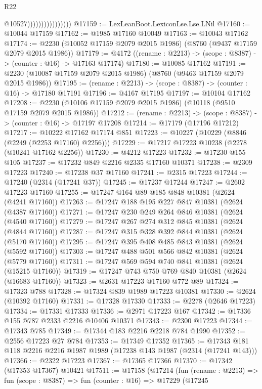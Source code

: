 \begin{lexlean}{R22}
\begin{coremodule}
                                    @10527))))))))))))))))
@17159 := LexLeanBoot.LexiconLse.Lse.LNil
@17160 := @10044 @17159
@17162 := @1985 @17160 @10049
@17163 := @10043 @17162
@17174 := @2230 (@10052 @17159 @2079 @2015 @1986) (@8760 (@9437 @17159 @2079 @2015 @1986))
@17179 := @4172 ((rename : @2213) -> (scope : @8387) -> (counter : @16) -> @17163 @17174)
@17180 := @10085 @17162
@17191 := @2230 (@10087 @17159 @2079 @2015 @1986) (@8760 (@9463 @17159 @2079 @2015 @1986))
@17195 := (rename : @2213) -> (scope : @8387) -> (counter : @16) -> @17180 @17191
@17196 := @4167 @17195
@17197 := @10104 @17162
@17208 := @2230 (@10106 @17159 @2079 @2015 @1986) (@10118 (@9510 @17159 @2079 @2015 @1986))
@17212 := (rename : @2213) -> (scope : @8387) -> (counter : @16) -> @17197 @17208
@17214 := @17179 (@17196 @17212)
@17217 := @10222 @17162 @17174 @851
@17223 := @10227 (@10229 (@8846 (@2249 (@2253 @17160) @2256)))
@17229 := @17217 @17223 @10238 (@2278 (@10241 @17162 @2256))
@17230 := @4212 @17223
@17232 := @17230 @155 @105
@17237 := @17232 @849 @2216 @2335 @17160 @10371
@17238 := @2309 @17223
@17240 := @17238 @37 @17160
@17241 := @2315 @17223
@17244 := @17240 (@2314 (@17241 @37))
@17245 := @17237 @17244
@17247 := @2602 @17223 @17160
@17255 := @17247 @164 @89 @185 @848 @10381 (@2624 (@4241 @17160))
@17263 := @17247 @188 @195 @227 @847 @10381 (@2624 (@4387 @17160))
@17271 := @17247 @230 @249 @264 @846 @10381 (@2624 (@4540 @17160))
@17279 := @17247 @267 @274 @312 @845 @10381 (@2624 (@4844 @17160))
@17287 := @17247 @315 @328 @392 @844 @10381 (@2624 (@5170 @17160))
@17295 := @17247 @395 @408 @485 @843 @10381 (@2624 (@5592 @17160))
@17303 := @17247 @488 @501 @566 @842 @10381 (@2624 (@5779 @17160))
@17311 := @17247 @569 @594 @740 @841 @10381 (@2624 (@15215 @17160))
@17319 := @17247 @743 @750 @769 @840 @10381 (@2624 (@16683 @17160))
@17323 := @2631 @17223 @17160 @772 @89
@17324 := @17323 @788
@17328 := @17324 @839 @1989 @17223 @10381
@17330 := @2624 (@10392 @17160)
@17331 := @17328 @17330
@17333 := @2278 (@2646 @17223)
@17334 := @17331 @17333
@17336 := @2971 @17223 @167
@17342 := @17336 @155 @787 @2333 @2216 @10406 @10371
@17343 := @2300 @17223
@17344 := @17343 @785
@17349 := @17344 @183 @2216 @2218 @784 @1990
@17352 := @2556 @17223 @27 @784
@17353 := @17349 @17352
@17365 := @17343 @181 @118 @2216 @2216 @1987 @1989 (@17238 @143 @1987 (@2314 (@17241 @143)))
@17366 := @2322 @17223
@17367 := @17365 @17366
@17370 := @17342 (@17353 @17367) @10421
@17511 := @17158
    (@17214
      (fun (rename : @2213) =>
      fun (scope : @8387) =>
      fun (counter : @16) =>
      @17229
        (@17245

\end{coremodule}
\end{lexlean}
